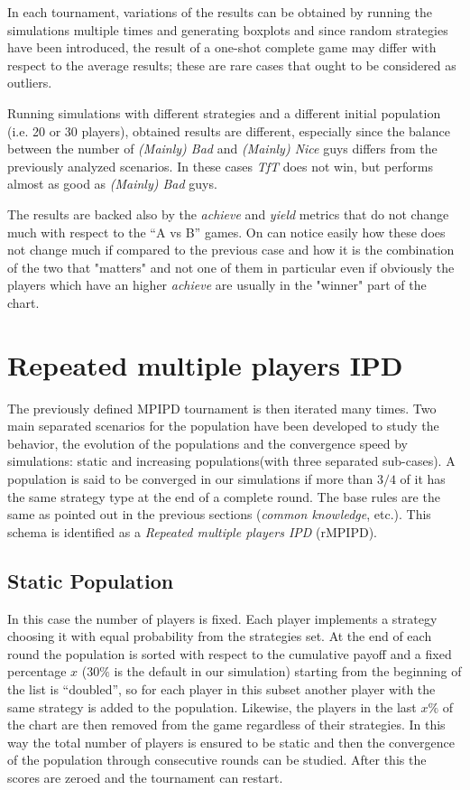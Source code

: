 \documentclass[journal,10pt,twoside]{IEEEtran}
\begin{document}
In each tournament, variations of the results can be obtained by running the simulations multiple times and generating boxplots and since random strategies have been introduced, the result of a one-shot complete game may differ with respect to the average results; these are rare cases that ought to be considered as outliers.

Running simulations with different strategies and a different initial population (i.e. 20 or 30 players), obtained results are different, especially since the balance between the number of \textit{(Mainly) Bad} and \textit{(Mainly) Nice} guys differs from the previously analyzed scenarios. In these cases \textit{TfT} does not win, but performs almost as good as \textit{(Mainly) Bad} guys.

The results are backed also by the \textit{achieve} and \textit{yield} metrics that do not change much with respect to the ``A vs B'' games. On can notice easily how these does not change much if compared to the previous case and how it is the combination of the two that "matters" and not one of them in particular even if obviously the players which have an higher \textit{achieve} are usually in the "winner" part of the chart. 

\section{Repeated multiple players IPD} \label{s:rIPDMP}
The previously defined MPIPD tournament is then iterated many times.
Two main separated scenarios for the population have been developed to study the behavior, the evolution of the populations and the convergence speed by simulations: static and increasing populations(with three separated sub-cases). A population is said to be converged in our simulations if more than $3/4$ of it has the same strategy type at the end of a complete round. The base rules are the same as pointed out in the previous sections (\textit{common knowledge},  etc.).
This schema is identified as a \textit{Repeated multiple players IPD} (rMPIPD).

\subsection{Static Population}
In this case the number of players is fixed. Each player implements a strategy choosing it with equal probability from the strategies set. At the end of each round the population is sorted with respect to the cumulative payoff and a fixed percentage $x$ ($30\%$ is the default in our simulation) starting from the beginning of the list is ``doubled'', so for each player in this subset another player with the same strategy is added to the population. Likewise, the players in the last $x\%$ of the chart are then removed from the game regardless of their strategies. In this way the total number of players is ensured to be static and then the convergence of the population through consecutive rounds can be studied. After this the scores are zeroed and the tournament can restart.
\end{document}
